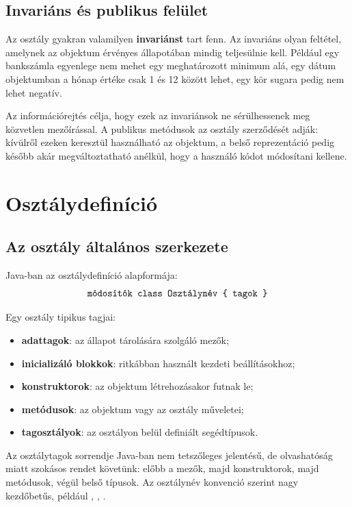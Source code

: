 \subsection{Invariáns és publikus felület}

Az osztály gyakran valamilyen \textbf{invariánst} tart fenn. Az invariáns olyan feltétel, amelynek az objektum érvényes állapotában mindig teljesülnie kell. Például egy bankszámla egyenlege nem mehet egy meghatározott minimum alá, egy dátum objektumban a hónap értéke csak 1 és 12 között lehet, egy kör sugara pedig nem lehet negatív.

Az információrejtés célja, hogy ezek az invariánsok ne sérülhessenek meg közvetlen mezőírással. A publikus metódusok az osztály szerződését adják: kívülről ezeken keresztül használható az objektum, a belső reprezentáció pedig később akár megváltoztatható anélkül, hogy a használó kódot módosítani kellene.

\section{Osztálydefiníció}

\subsection{Az osztály általános szerkezete}

Java-ban az osztálydefiníció alapformája:
\[
  \texttt{módosítók class Osztálynév \{ tagok \}}
\]

Egy osztály tipikus tagjai:

\begin{itemize}
  \item \textbf{adattagok}: az állapot tárolására szolgáló mezők;
  \item \textbf{inicializáló blokkok}: ritkábban használt kezdeti beállításokhoz;
  \item \textbf{konstruktorok}: az objektum létrehozásakor futnak le;
  \item \textbf{metódusok}: az objektum vagy az osztály műveletei;
  \item \textbf{tagosztályok}: az osztályon belül definiált segédtípusok.
\end{itemize}

Az osztálytagok sorrendje Java-ban nem tetszőleges jelentésű, de olvashatóság miatt szokásos rendet követünk: előbb a mezők, majd konstruktorok, majd metódusok, végül belső típusok. Az osztálynév konvenció szerint nagy kezdőbetűs, például , , .

